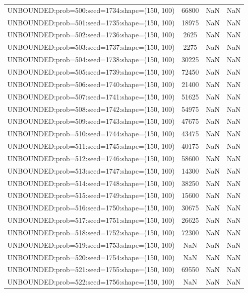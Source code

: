 \begin{longtable}{lccc}
UNBOUNDED:prob=500:seed=1734:shape=(150, 100) & 66800 &   NaN &    NaN \\
UNBOUNDED:prob=501:seed=1735:shape=(150, 100) & 18975 &   NaN &    NaN \\
UNBOUNDED:prob=502:seed=1736:shape=(150, 100) &  2625 &   NaN &    NaN \\
UNBOUNDED:prob=503:seed=1737:shape=(150, 100) &  2275 &   NaN &    NaN \\
UNBOUNDED:prob=504:seed=1738:shape=(150, 100) & 30225 &   NaN &    NaN \\
UNBOUNDED:prob=505:seed=1739:shape=(150, 100) & 72450 &   NaN &    NaN \\
UNBOUNDED:prob=506:seed=1740:shape=(150, 100) & 21400 &   NaN &    NaN \\
UNBOUNDED:prob=507:seed=1741:shape=(150, 100) & 51625 &   NaN &    NaN \\
UNBOUNDED:prob=508:seed=1742:shape=(150, 100) & 54975 &   NaN &    NaN \\
UNBOUNDED:prob=509:seed=1743:shape=(150, 100) & 47675 &   NaN &    NaN \\
UNBOUNDED:prob=510:seed=1744:shape=(150, 100) & 43475 &   NaN &    NaN \\
UNBOUNDED:prob=511:seed=1745:shape=(150, 100) & 40175 &   NaN &    NaN \\
UNBOUNDED:prob=512:seed=1746:shape=(150, 100) & 58600 &   NaN &    NaN \\
UNBOUNDED:prob=513:seed=1747:shape=(150, 100) & 14300 &   NaN &    NaN \\
UNBOUNDED:prob=514:seed=1748:shape=(150, 100) & 38250 &   NaN &    NaN \\
UNBOUNDED:prob=515:seed=1749:shape=(150, 100) & 15600 &   NaN &    NaN \\
UNBOUNDED:prob=516:seed=1750:shape=(150, 100) & 30675 &   NaN &    NaN \\
UNBOUNDED:prob=517:seed=1751:shape=(150, 100) & 26625 &   NaN &    NaN \\
UNBOUNDED:prob=518:seed=1752:shape=(150, 100) & 72300 &   NaN &    NaN \\
UNBOUNDED:prob=519:seed=1753:shape=(150, 100) &   NaN &   NaN &    NaN \\
UNBOUNDED:prob=520:seed=1754:shape=(150, 100) &   NaN &   NaN &    NaN \\
UNBOUNDED:prob=521:seed=1755:shape=(150, 100) & 69550 &   NaN &    NaN \\
UNBOUNDED:prob=522:seed=1756:shape=(150, 100) &   NaN &   NaN &    NaN \\

\end{longtable}
